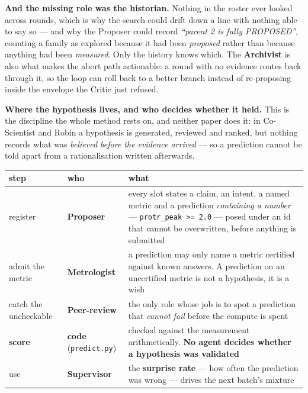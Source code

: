 \documentclass[11pt,a4paper]{article}
\newcommand{\code}[1]{\texttt{#1}}
\begin{document}
\textbf{And the missing role was the historian.} Nothing in the roster ever looked across rounds,
which is why the search could drift down a line with nothing able to say so --- and why the
Proposer could record \emph{``parent 2 is fully PROPOSED''}, counting a family as explored because
it had been \emph{proposed} rather than because anything had been \emph{measured}. Only the history
knows which. The \textbf{Archivist} is also what makes the abort path actionable: a round with no
evidence routes back through it, so the loop can roll back to a better branch instead of
re-proposing inside the envelope the Critic just refused.

\vspace{4pt}
\textbf{Where the hypothesis lives, and who decides whether it held.} This is the discipline the
whole method rests on, and neither paper does it: in Co-Scientist and Robin a hypothesis is
generated, reviewed and ranked, but nothing records what was \emph{believed before the evidence
arrived} --- so a prediction cannot be told apart from a rationalisation written afterwards.

\begin{center}\small
\begin{tabular}{@{}l l p{8.4cm}@{}}
\toprule
\textbf{step} & \textbf{who} & \textbf{what}\\
\midrule
register & \textbf{Proposer} & every slot states a claim, an intent, a named metric and a
prediction \emph{containing a number} --- \code{protr\_peak >= 2.0} --- posed under an id that
cannot be overwritten, before anything is submitted\\
admit the metric & \textbf{Metrologist} & a prediction may only name a metric certified against
known answers. A prediction on an uncertified metric is not a hypothesis, it is a wish\\
catch the uncheckable & \textbf{Peer-review} & the only role whose job is to spot a prediction
that \emph{cannot fail} before the compute is spent\\
\textbf{score} & \textbf{code} (\code{predict.py}) & checked against the measurement
arithmetically. \textbf{No agent decides whether a hypothesis was validated}\\
use & \textbf{Supervisor} & the \textbf{surprise rate} --- how often the prediction was wrong ---
drives the next batch's mixture\\
\bottomrule
\end{tabular}
\end{center}
\end{document}
